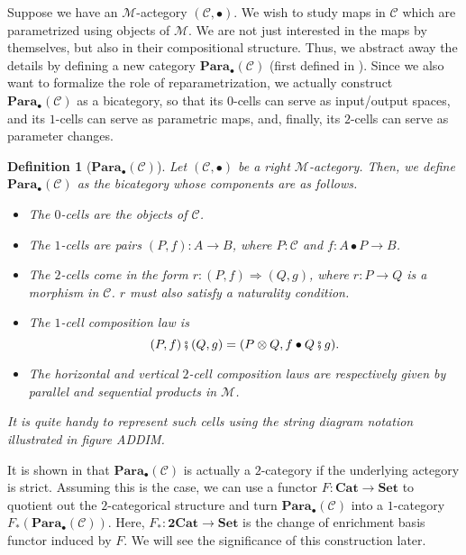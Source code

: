 \documentclass[12pt,a4paper,openright,twoside]{report}
\theoremstyle{plain}
\newtheorem{definition}[proposition]{Definition}
\theoremstyle{definition}
\begin{document}
Suppose we have an $\mathcal{M}$-actegory $(\mathcal{C}, \bullet)$. We wish to study maps in $\mathcal{C}$ which are parametrized using objects of $\mathcal{M}$. We are not just interested in the maps by themselves, but also in their compositional structure. Thus, we abstract away the details by defining a new category $\mathbf{Para}_{\bullet}(\mathcal{C})$ (first defined in \cite{fong2019backprop}). Since we also want to formalize the role of reparametrization, we actually construct $\mathbf{Para}_{\bullet}(\mathcal{C})$ as a bicategory, so that its $0$-cells can serve as input/output spaces, and its $1$-cells can serve as parametric maps, and, finally, its $2$-cells can serve as parameter changes.

\begin{definition}[$\mathbf{Para}_{\bullet}(\mathcal{C})$]
  Let $(\mathcal{C}, \bullet)$ be a right $\mathcal{M}$-actegory. Then, we define $\mathbf{Para}_{\bullet}(\mathcal{C})$ as the bicategory whose components are as follows.
  \begin{itemize}
    \item The $0$-cells are the objects of $\mathcal{C}$.
    \item The $1$-cells are pairs $(P,f): A \to B$, where $P : \mathcal{C}$ and $f: A \bullet P \to B$.
    \item The $2$-cells come in the form $r: (P,f) \Rightarrow (Q,g)$, where $r: P \to Q$ is a morphism in $\mathcal{C}$. $r$ must also satisfy a naturality condition.
    \item The $1$-cell composition law is
    \[(P,f) \fatsemi (Q,g) = (P \otimes Q, f \bullet Q \fatsemi g).\]
    \item The horizontal and vertical $2$-cell composition laws are respectively given by parallel and sequential products in $\mathcal{M}$. 
  \end{itemize}
  It is quite handy to represent such cells using the string diagram notation illustrated in figure ADDIM.
\end{definition}


It is shown in \cite{gavranovic2024fundamental} that $\mathbf{Para}_{\bullet}(\mathcal{C})$ is actually a $2$-category if the underlying actegory is strict. Assuming this is the case, we can use a functor $F: \mathbf{Cat} \to \mathbf{Set}$ to quotient out the $2$-categorical structure and turn $\mathbf{Para}_{\bullet}(\mathcal{C})$ into a $1$-category $F_{*}(\mathbf{Para}_{\bullet}(\mathcal{C}))$. Here, $F_{*}: \mathbf{2Cat} \to \mathbf{Set}$ is the change of enrichment basis functor induced by $F$. We will see the significance of this construction later.
\end{document}
